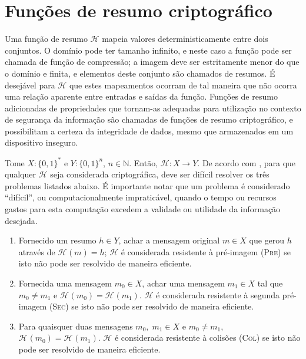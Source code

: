 \documentclass{article}
\newcommand{\hh}{$\mathcal{H}$}
\newcommand{\hash}[2][]{\mathcal{H}^{#1}(#2)}
\newcommand{\binwds}[1]{\{0, 1\}^{#1}}
\begin{document}
\section{Funções de resumo criptográfico}

Uma função de resumo \hh{} mapeia valores deterministicamente entre dois
conjuntos. O domínio pode ter tamanho infinito, e neste caso a função pode ser
chamada de função de compressão; a imagem deve ser estritamente menor do que o
domínio e finita, e elementos deste conjunto são chamados de resumos. É
desejável para \hh{} que estes mapeamentos ocorram de tal maneira que não
ocorra uma relação aparente entre entradas e saídas da função. Funções de
resumo adicionadas de propriedades que tornam-as adequadas para utilização no
contexto de segurança da informação são chamadas de funções de resumo
criptográfico, e possibilitam a certeza da integridade de dados, mesmo que
armazenados em um dispositivo inseguro.

Tome $X : \binwds{*}$ e $Y : \binwds{n}$, $n \in \mathbb{N}$. Então,
$\mathcal{H} : X \longrightarrow Y$. De acordo com
\cite{stinson2005cryptography}, para que qualquer \hh{} seja considerada
criptográfica, deve ser difícil resolver os três problemas listados abaixo.
É importante notar que um problema é considerado ``difícil'', ou
computacionalmente impraticável, quando o tempo ou recursos gastos para esta
computação excedem a validade ou utilidade da informação desejada.

\begin{enumerate}[label=\roman*.]

  \item Fornecido um resumo $h \in Y$, achar a mensagem original $m \in X$ que
    gerou $h$ através de $\hash{m} = h$; \hh{} é considerada resistente à
    pré-imagem (\textsc{Pre}) se isto não pode ser resolvido de maneira
    eficiente.

  \item Fornecida uma mensagem $m_0 \in X$, achar uma mensagem $m_1 \in X$ tal
    que $m_0 \neq m_1$ e $\hash{m_0} = \hash{m_1}$. \hh{} é considerada
    resistente à segunda pré-imagem (\textsc{Sec}) se isto não pode ser
    resolvido de maneira eficiente.

  \item Para quaisquer duas mensagens $m_0, \; m_1 \in X$ e $m_0 \neq m_1$,
    $\hash{m_0} = \hash{m_1}$. \hh{} é considerada resistente à colisões
    (\textsc{Col}) se isto não pode ser resolvido de maneira eficiente.

\end{enumerate}
\end{document}
